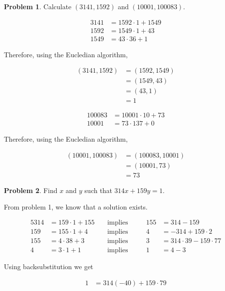 \documentclass{article}
\theoremstyle{definition}
\newtheorem{problem}{Problem}[section]
\begin{document}
  \begin{problem}
    Calculate $(3141, 1592)$ and $(10001, 100083)$.
  \end{problem}
  
  \begin{align*}
    3141 &= 1592 \cdot 1 + 1549 \\
    1592 &= 1549 \cdot 1 + 43 \\
    1549 &= 43 \cdot 36 + 1
  \end{align*}
  
  Therefore, using the Eucledian algorithm,
  
  \begin{align*}
    (3141, 1592) &= (1592, 1549) \\
    &= (1549, 43) \\
    &= (43, 1) \\
    &= 1
  \end{align*}
  
  \begin{align*}
    100083 &= 10001 \cdot 10 + 73 \\
    10001 &= 73 \cdot 137 + 0
  \end{align*}
  
  Therefore, using the Eucledian algorithm,
  
  \begin{align*}
    (10001, 100083) &= (100083, 10001) \\
    &= (10001, 73) \\
    &= 73
  \end{align*}
  
  \begin{problem}
    Find $x$ and $y$ such that $314x + 159y = 1$.
  \end{problem}
  
  From problem 1, we know that a solution exists.
  
  \begin{alignat*}{5}
    314 &= 159 \cdot 1 + 155 &\;&\text{implies} &\;&&155 &= 314 - 159 \\
    159 &= 155 \cdot 1 + 4 &\;&\text{implies} &\;&&4 &= -314 + 159 \cdot 2 \\
    155 &= 4 \cdot 38 + 3 &\;&\text{implies} &\;&& 3 &= 314 \cdot 39 - 159 \cdot 77 \\
    4 &= 3 \cdot 1 + 1 &\;&\text{implies} &\;&& 1 &= 4 - 3
  \end{alignat*}
  
  Using backsubstitution we get
  
  \begin{align*}
    1 &= 314 (-40) + 159 \cdot 79
  \end{align*}
  
\end{document}
